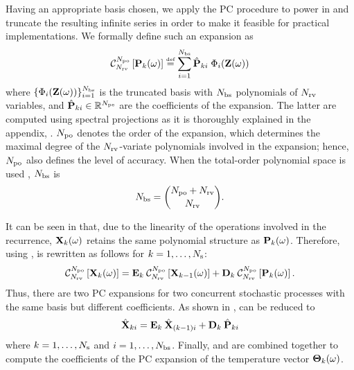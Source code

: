 Having an appropriate basis chosen, we apply the PC procedure to power in  and truncate the resulting infinite series in order to make it feasible for practical implementations. We formally define such an expansion as
\begin{equation} \elabel{pc-expansion}
  \oPC{\vars}{\pcorder}{\vP_k(\o)} \eqdef \sum_{i = 1}^{\pcterms} \pcc{\vP}_{ki} \; \pcb_i(\vZ(\o))
\end{equation}
where $\{ \Phi_i(\mathbf{Z}(\omega)) \}_{i = 1}^{{N_\text{bs}}}$ is the truncated basis with ${N_\text{bs}}$ polynomials of ${N_\text{rv}}$ variables, and $\hat{\mathbf{P}}_{ki} \in \mathbb{R}^{N_\text{pe}}$ are the coefficients of the expansion. The latter are computed using spectral projections as it is thoroughly explained in the appendix, . ${N_\text{po}}$ denotes the order of the expansion, which determines the maximal degree of the ${N_\text{rv}}$-variate polynomials involved in the expansion; hence, ${N_\text{po}}$ also defines the level of accuracy. When the total-order polynomial space is used \cite{beck2011}, ${N_\text{bs}}$ is
\begin{equation} \elabel{pc-terms}
  \pcterms = { \pcorder + \vars \choose \vars }.
\end{equation}

It can be seen in  that, due to the linearity of the operations involved in the recurrence, $\mathbf{X}_k(\omega)$ retains the same polynomial structure as $\mathbf{P}_k(\omega)$. Therefore, using ,  is rewritten as follows for $k = 1, \dotsc, N_\text{s}$:
\begin{equation} \elabel{expanded-recurrence}
  \oPC{\vars}{\pcorder}{\vX_k(\o)} = \mE_k \: \oPC{\vars}{\pcorder}{\vX_{k-1}(\o)} + \mD_k \: \oPC{\vars}{\pcorder}{\vP_k(\o)}.
\end{equation}
Thus, there are two PC expansions for two concurrent stochastic processes with the same basis but different coefficients. As shown in ,  can be reduced to
\begin{equation} \elabel{pc-recurrence}
  \pcc{\vX}_{ki} = \mE_k \: \pcc{\vX}_{(k - 1)i} + \mD_k \: \pcc{\vP}_{ki}
\end{equation}
where $k = 1, \dotsc, N_\text{s}$ and $i = 1, \dotsc, {N_\text{bs}}$. Finally,  and  are combined together to compute the coefficients of the PC expansion of the temperature vector ${\boldsymbol\Theta}_k(\omega)$.


